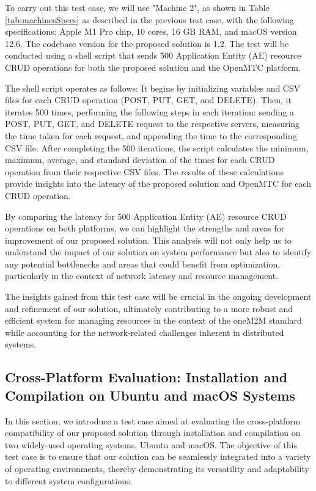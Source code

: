 \documentclass[a4paper,fleqn]{cas-dc}
\begin{document}
To carry out this test case, we will use "Machine 2", as shown in Table \ref{tab:machinesSpecs} as described in the previous test case, with the following specifications: Apple M1 Pro chip, 10 cores, 16 GB RAM, and macOS version 12.6. The codebase version for the proposed solution is 1.2. The test will be conducted using a shell script that sends 500 Application Entity (AE) resource CRUD operations for both the proposed solution and the OpenMTC platform.

The shell script operates as follows: It begins by initializing variables and CSV files for each CRUD operation (POST, PUT, GET, and DELETE). Then, it iterates 500 times, performing the following steps in each iteration: sending a POST, PUT, GET, and DELETE request to the respective servers, measuring the time taken for each request, and appending the time to the corresponding CSV file. After completing the 500 iterations, the script calculates the minimum, maximum, average, and standard deviation of the times for each CRUD operation from their respective CSV files. The results of these calculations provide insights into the latency of the proposed solution and OpenMTC for each CRUD operation.

By comparing the latency for 500 Application Entity (AE) resource CRUD operations on both platforms, we can highlight the strengths and areas for improvement of our proposed solution. This analysis will not only help us to understand the impact of our solution on system performance but also to identify any potential bottlenecks and areas that could benefit from optimization, particularly in the context of network latency and resource management.

The insights gained from this test case will be crucial in the ongoing development and refinement of our solution, ultimately contributing to a more robust and efficient system for managing resources in the context of the oneM2M standard while accounting for the network-related challenges inherent in distributed systems.



\subsection{Cross-Platform Evaluation: Installation and Compilation on Ubuntu and macOS Systems}

In this section, we introduce a test case aimed at evaluating the cross-platform compatibility of our proposed solution through installation and compilation on two widely-used operating systems, Ubuntu and macOS. The objective of this test case is to ensure that our solution can be seamlessly integrated into a variety of operating environments, thereby demonstrating its versatility and adaptability to different system configurations.
\end{document}
